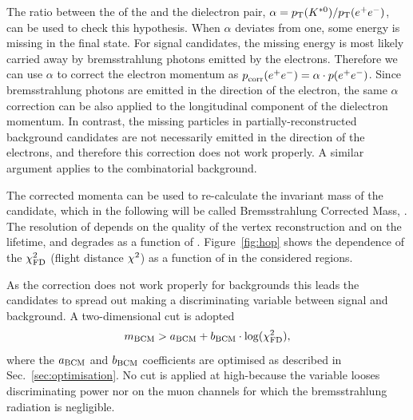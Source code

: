 The ratio between the \pt of the \Kstarz and the dielectron pair, $\alpha = \mbox{$p_{\rm T}$}({{K}^{*0}}) / \mbox{$p_{\rm T}$}(e^+ e^-)$, can be used to check this hypothesis.
When $\alpha$ deviates from one, some energy is missing in the final state. 
For signal candidates, the missing energy is most likely carried away by bremsstrahlung photons emitted
by the electrons. Therefore we can use $\alpha$ to correct the electron momentum as $\mbox{$p$}_{\textrm{corr}}(e^+ e^-) = \alpha \cdot \mbox{$p$}(e^+ e^-)$.
Since bremsstrahlung photons are emitted in the direction of the electron, the same $\alpha$ correction can
be also applied to the longitudinal component of the dielectron momentum.
In contrast, the missing particles in partially-reconstructed background candidates are not necessarily emitted in the
direction of the electrons, and therefore this correction does not work properly.
A similar argument applies to the combinatorial background. 

The corrected momenta can be used to re-calculate the invariant mass of the \Bz candidate, which in the following will be
called Bremsstrahlung Corrected Mass, \mbcm. The resolution of \mbcm depends on the quality of the vertex reconstruction
and on the \Bz lifetime, and degrades as a function of \qsq. Figure~\ref{fig:hop} shows the dependence of the \Bz $\chi^2_{\rm FD}$ 
(flight distance $\chi^2$) as a function of \mbcm in the considered \qsq regions. 

As the correction does not work properly for backgrounds this leads the candidates to spread out making \mbcm 
a discriminating variable between signal and background. A two-dimensional cut is adopted
%
$$m_{\rm BCM} > a_{\rm BCM} + b_{\rm BCM} \cdot \log(\chi^2_{\rm FD}),$$
%
where the $a_{\rm BCM}$ and $b_{\rm BCM}$ coefficients are optimised as described in Sec.~\ref{sec:optimisation}.
%
No cut is applied at high-\qsq because the variable looses discriminating power nor on the muon 
channels for which the bremsstrahlung radiation is negligible.




